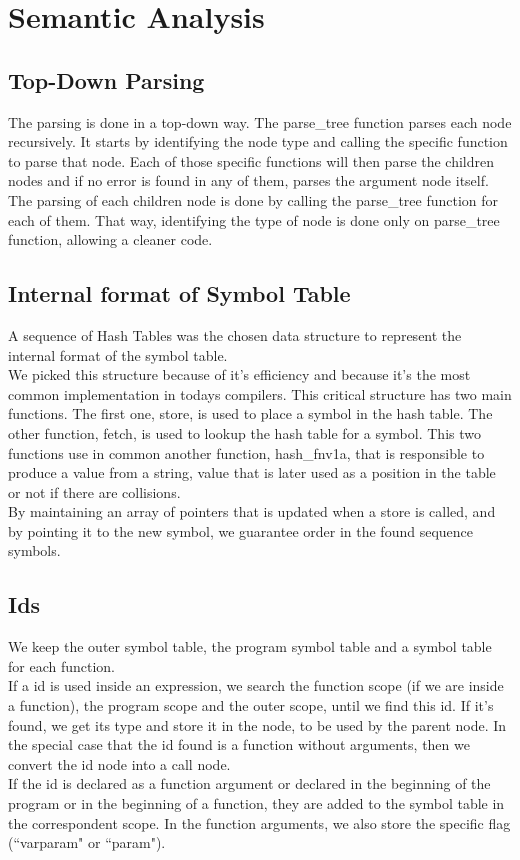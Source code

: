\documentclass[12pt]{article}
\begin{document}
\newpage

\section{Semantic Analysis}

\subsection{Top-Down Parsing}

The parsing is done in a top-down way. The parse\_tree function parses each node recursively. It starts by identifying the node type and calling the specific function to parse that node. Each of those specific functions will then parse the children nodes and if no error is found in any of them, parses the argument node itself. The parsing of each children node is done by calling the parse\_tree function for each of them. That way, identifying the type of node is done only on parse\_tree function, allowing a cleaner code.\\

\subsection{Internal format of Symbol Table}

A sequence of Hash Tables was the chosen data structure to represent the internal format of the symbol table. \\
We picked this structure because of it's efficiency and because it's the most common implementation in todays compilers. This critical structure has two main functions. The first one, store, is used to place a symbol in the hash table. The other function, fetch, is used to lookup the hash table for a symbol. This two functions use in common another function, hash\_fnv1a, that is responsible to produce a value from a string, value that is later used as a position in the table or not if there are collisions. \\
By maintaining an array of pointers that is updated when a store is called, and by pointing it to the new symbol, we guarantee order in the found sequence symbols. \\

\subsection{Ids}

We keep the outer symbol table, the program symbol table and a symbol table for each function. \\
If a id is used inside an expression, we search the function scope (if we are inside a function), the program scope and the outer scope, until we find this id. If it's found, we get its type and store it in the node, to be used by the parent node. In the special case that the id found is a function without arguments, then we convert the id node into a call node. \\
If the id is declared as a function argument or declared in the beginning of the program or in the beginning of a function, they are added to the symbol table in the correspondent scope. In the function arguments, we also store the specific flag (``varparam" or ``param").
\end{document}
